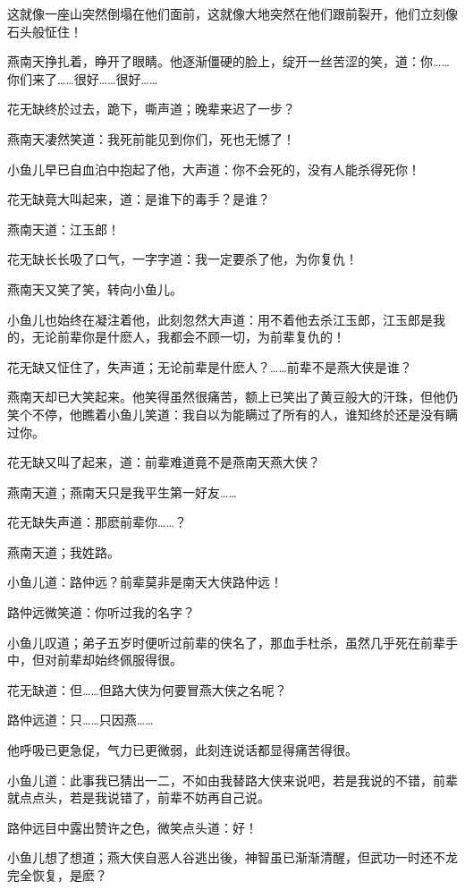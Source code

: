\documentclass[12pt,oneside]{book}
\begin{document}
这就像一座山突然倒塌在他们面前，这就像大地突然在他们跟前裂开，他们立刻像石头般怔住！

燕南天挣扎着，睁开了眼睛。他逐渐僵硬的脸上，绽开一丝苦涩的笑，道：你\ldots\ldots 你们来了\ldots\ldots 很好\ldots\ldots 很好\ldots\ldots{}

花无缺终於过去，跪下，嘶声道；晚辈来迟了一步？

燕南天凄然笑道：我死前能见到你们，死也无憾了！

小鱼儿早已自血泊中抱起了他，大声道：你不会死的，没有人能杀得死你！

花无缺竟大叫起来，道：是谁下的毒手？是谁？

燕南天道：江玉郎！

花无缺长长吸了口气，一字字道：我一定要杀了他，为你复仇！

燕南天又笑了笑，转向小鱼儿。

小鱼儿也始终在凝注着他，此刻忽然大声道：用不着他去杀江玉郎，江玉郎是我的，无论前辈你是什麽人，我都会不顾一切，为前辈复仇的！

花无缺又怔住了，失声道；无论前辈是什麽人？\ldots\ldots 前辈不是燕大侠是谁？

燕南天却已大笑起来。他笑得虽然很痛苦，额上已笑出了黄豆般大的汗珠，但他仍笑个不停，他瞧着小鱼儿笑道：我自以为能瞒过了所有的人，谁知终於还是没有瞒过你。

花无缺又叫了起来，道：前辈难道竟不是燕南天燕大侠？

燕南天道；燕南天只是我平生第一好友\ldots\ldots{}

花无缺失声道：那麽前辈你\ldots\ldots？

燕南天道；我姓路。

小鱼儿道：路仲远？前辈莫非是南天大侠路仲远！

路仲远微笑道：你听过我的名字？

小鱼儿叹道；弟子五岁时便听过前辈的侠名了，那血手杜杀，虽然几乎死在前辈手中，但对前辈却始终佩服得很。

花无缺道：但\ldots\ldots 但路大侠为何要冒燕大侠之名呢？

路仲远道：只\ldots\ldots 只因燕\ldots\ldots{}

他呼吸已更急促，气力已更微弱，此刻连说话都显得痛苦得很。

小鱼儿道：此事我已猜出一二，不如由我替路大侠来说吧，若是我说的不错，前辈就点点头，若是我说错了，前辈不妨再自己说。

路仲远目中露出赞许之色，微笑点头道：好！

小鱼儿想了想道；燕大侠自恶人谷逃出後，神智虽已渐渐清醒，但武功一时还不龙完全恢复，是麽？
\end{document}
